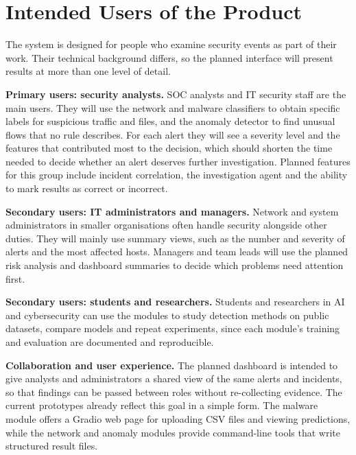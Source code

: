 \section{Intended Users of the Product}

The system is designed for people who examine security events as part of their work. Their technical background differs, so the planned interface will present results at more than one level of detail.

\textbf{Primary users: security analysts.} SOC analysts and IT security staff are the main users. They will use the network and malware classifiers to obtain specific labels for suspicious traffic and files, and the anomaly detector to find unusual flows that no rule describes. For each alert they will see a severity level and the features that contributed most to the decision, which should shorten the time needed to decide whether an alert deserves further investigation. Planned features for this group include incident correlation, the investigation agent and the ability to mark results as correct or incorrect.

\textbf{Secondary users: IT administrators and managers.} Network and system administrators in smaller organisations often handle security alongside other duties. They will mainly use summary views, such as the number and severity of alerts and the most affected hosts. Managers and team leads will use the planned risk analysis and dashboard summaries to decide which problems need attention first.

\textbf{Secondary users: students and researchers.} Students and researchers in AI and cybersecurity can use the modules to study detection methods on public datasets, compare models and repeat experiments, since each module's training and evaluation are documented and reproducible.

\textbf{Collaboration and user experience.} The planned dashboard is intended to give analysts and administrators a shared view of the same alerts and incidents, so that findings can be passed between roles without re-collecting evidence. The current prototypes already reflect this goal in a simple form. The malware module offers a Gradio web page for uploading CSV files and viewing predictions, while the network and anomaly modules provide command-line tools that write structured result files.
